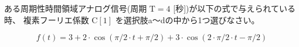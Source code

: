 ある周期性時間領域アナログ信号(周期 $\textrm{T} = 4$ [秒])が以下の式で与えられている時、
複素フーリエ係数 $\textrm{C}[1]$ を選択肢a〜dの中から1つ選びなさい。

\[
f(t) = 
3
+ 2 \cdot \cos( \pi/2 \cdot t + \pi/2)
+ 3 \cdot \cos( 2 \cdot \pi/2 \cdot t -\pi/2 )
\]
